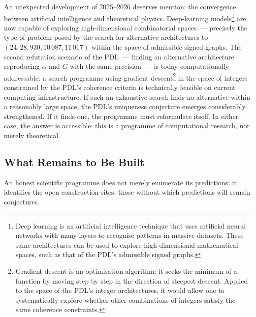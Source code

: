 \documentclass[12pt, a4paper, openright]{book}
\begin{document}
An unexpected development of 2025--2026 deserves mention: the convergence between artificial intelligence and theoretical physics. Deep-learning models\footnote{Deep learning is an artificial intelligence technique that uses artificial neural networks with many layers to recognise patterns in massive datasets. These same architectures can be used to explore high-dimensional mathematical spaces, such as that of the PDL's admissible signed graphs.} are now capable of exploring high-dimensional combinatorial spaces~--- precisely the type of problem posed by the search for alternative architectures to $(24, 28, 930, 10\,087, 11\,017)$ within the space of admissible signed graphs. The second refutation scenario of the PDL~--- finding an alternative architecture reproducing $\alpha$ and $G$ with the same precision~--- is today computationally addressable: a search programme using gradient descent\footnote{Gradient descent is an optimisation algorithm: it seeks the minimum of a function by moving step by step in the direction of steepest descent. Applied to the space of the PDL's integer architectures, it would allow one to systematically explore whether other combinations of integers satisfy the same coherence constraints.} in the space of integers constrained by the PDL's coherence criteria is technically feasible on current computing infrastructure. If such an exhaustive search finds no alternative within a reasonably large space, the PDL's uniqueness conjecture emerges considerably strengthened. If it finds one, the programme must reformulate itself. In either case, the answer is accessible: this is a programme of computational research, not merely theoretical.

\subsection*{What Remains to Be Built}

An honest scientific programme does not merely enumerate its predictions: it identifies the open construction sites, those without which predictions will remain conjectures.
\end{document}
